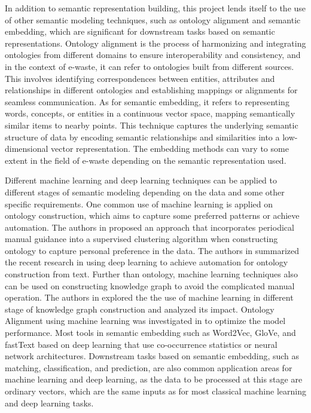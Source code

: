 \documentclass{article}
\numberwithin{equation}{section}
\begin{document}
In addition to semantic representation building, this project lends itself to the use of other semantic modeling techniques, such as ontology alignment\cite{Shva13} and semantic embedding\cite{penn14}, which are significant for downstream tasks based on semantic representations. Ontology alignment is the process of harmonizing and integrating ontologies from different domains to ensure interoperability and consistency, and in the context of e-waste, it can refer to ontologies built from different sources. This involves identifying correspondences between entities, attributes and relationships in different ontologies and establishing mappings or alignments for seamless communication. As for semantic embedding, it refers to representing words, concepts, or entities in a continuous vector space, mapping semantically similar items to nearby points. This technique captures the underlying semantic structure of data by encoding semantic relationships and similarities into a low-dimensional vector representation. The embedding methods can vary to some extent in the field of e-waste depending on the semantic representation used.

Different machine learning and deep learning techniques can be applied to different stages of semantic modeling depending on the data and some other specific requirements. One common use of machine learning is applied on ontology construction, which aims to capture some preferred patterns or achieve automation. The authors in \cite{yan08} proposed an approach that incorporates periodical manual guidance into a supervised clustering algorithm when constructing ontology to capture personal preference in the data. The authors in \cite{al20} summarized the recent research in using deep learning to achieve automation for ontology construction from text. Further than ontology, machine learning techniques also can be used on constructing knowledge graph to avoid the complicated manual operation. The authors in \cite{zhao24} explored the the use of machine learning in different stage of knowledge graph construction and analyzed its impact. Ontology Alignment using machine learning was investigated in \cite{nezh11} to optimize the model performance. Most tools in semantic embedding such as Word2Vec\cite{miko13}, GloVe\cite{penn14}, and fastText\cite{boja16} based on deep learning that use co-occurrence statistics or neural network architectures. Downstream tasks based on semantic embedding, such as matching, classification, and prediction, are also common application areas for machine learning and deep learning, as the data to be processed at this stage are ordinary vectors, which are the same inputs as for most classical machine learning and deep learning tasks. 
\end{document}

